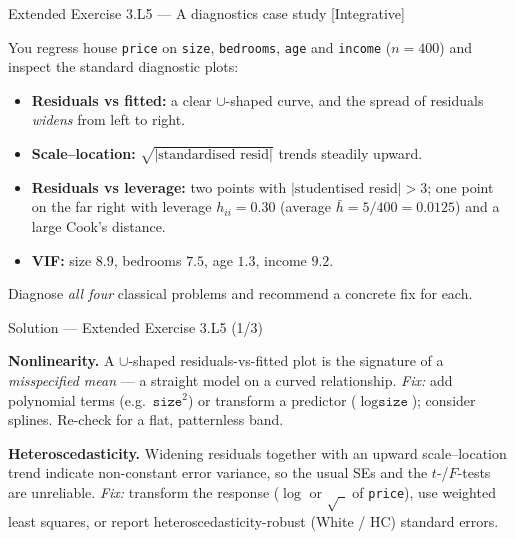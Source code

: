\documentclass[aspectratio=169,11pt]{beamer}
\begin{document}
\begin{frame}{Extended Exercise 3.L5 --- A diagnostics case study [Integrative]}
  \begin{longexercise}
    You regress house \texttt{price} on \texttt{size}, \texttt{bedrooms},
    \texttt{age} and \texttt{income} ($n=400$) and inspect the standard
    diagnostic plots:
    \begin{itemize}
      \item \textbf{Residuals vs fitted:} a clear $\cup$-shaped curve, and
            the spread of residuals \emph{widens} from left to right.
      \item \textbf{Scale--location:} $\sqrt{|\text{standardised resid}|}$
            trends steadily upward.
      \item \textbf{Residuals vs leverage:} two points with
            $|\text{studentised resid}|>3$; one point on the far right with
            leverage $h_{ii}=0.30$ (average $\bar h=5/400=0.0125$) and a
            large Cook's distance.
      \item \textbf{VIF:} size $8.9$, bedrooms $7.5$, age $1.3$, income $9.2$.
    \end{itemize}
    Diagnose \emph{all four} classical problems and recommend a concrete
    fix for each.
  \end{longexercise}
\end{frame}

\begin{frame}{Solution --- Extended Exercise 3.L5 (1/3)}
  \begin{solutionbox}
    \textbf{Nonlinearity.} A $\cup$-shaped residuals-vs-fitted plot is
    the signature of a \emph{misspecified mean} --- a straight model on a
    curved relationship. \emph{Fix:} add polynomial terms (e.g.\
    $\texttt{size}^2$) or transform a predictor ($\log\texttt{size}$);
    consider splines. Re-check for a flat, patternless band.

    \textbf{Heteroscedasticity.} Widening residuals together with an
    upward scale--location trend indicate non-constant error variance, so
    the usual SEs and the $t$-/$F$-tests are unreliable. \emph{Fix:}
    transform the response ($\log$ or $\sqrt{\ \ }$ of \texttt{price}), use
    weighted least squares, or report heteroscedasticity-robust
    (White / HC) standard errors.
  \end{solutionbox}
\end{frame}
\end{document}
